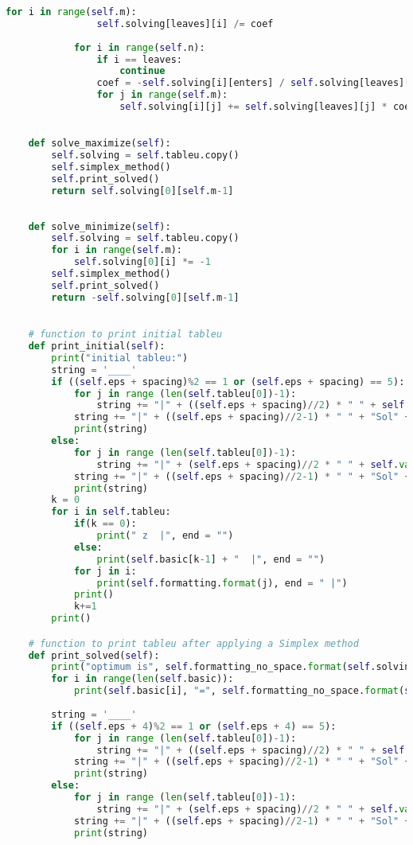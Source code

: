 \documentclass[12pt, legalpaper]{exam}
\begin{document}
\begin{lstlisting}[language=Python, caption=Программа на Python, label=lst:python-code]
            for i in range(self.m):
                self.solving[leaves][i] /= coef
        
            for i in range(self.n):
                if i == leaves:
                    continue
                coef = -self.solving[i][enters] / self.solving[leaves][enters]
                for j in range(self.m):
                    self.solving[i][j] += self.solving[leaves][j] * coef

    
    def solve_maximize(self):
        self.solving = self.tableu.copy()
        self.simplex_method()
        self.print_solved()
        return self.solving[0][self.m-1]
        
    
    def solve_minimize(self): 
        self.solving = self.tableu.copy()
        for i in range(self.m):
            self.solving[0][i] *= -1
        self.simplex_method()
        self.print_solved()
        return -self.solving[0][self.m-1]

    
    # function to print initial tableu
    def print_initial(self):
        print("initial tableu:")
        string = '____'
        if ((self.eps + spacing)%2 == 1 or (self.eps + spacing) == 5):
            for j in range (len(self.tableu[0])-1):
                string += "|" + ((self.eps + spacing)//2) * " " + self.vars[j] + ((self.eps + spacing)//2) * " "
            string += "|" + ((self.eps + spacing)//2-1) * " " + "Sol" + (self.eps + spacing)//2 * " " + "|"
            print(string)
        else: 
            for j in range (len(self.tableu[0])-1):
                string += "|" + (self.eps + spacing)//2 * " " + self.vars[j] + ((self.eps + spacing)//2-1) * " "
            string += "|" + ((self.eps + spacing)//2-1) * " " + "Sol" + ((self.eps + spacing)//2-1) * " " + "|"
            print(string)
        k = 0
        for i in self.tableu:
            if(k == 0):
                print(" z  |", end = "")
            else:
                print(self.basic[k-1] + "  |", end = "")
            for j in i:
                print(self.formatting.format(j), end = " |")
            print()
            k+=1
        print()

    # function to print tableu after applying a Simplex method
    def print_solved(self):
        print("optimum is", self.formatting_no_space.format(self.solving[0][self.m-1]))
        for i in range(len(self.basic)):
            print(self.basic[i], "=", self.formatting_no_space.format(self.solving[i+1][self.m-1]))
            
        string = '____'
        if ((self.eps + 4)%2 == 1 or (self.eps + 4) == 5):
            for j in range (len(self.tableu[0])-1):
                string += "|" + ((self.eps + spacing)//2) * " " + self.vars[j] + ((self.eps + spacing)//2) * " "
            string += "|" + ((self.eps + spacing)//2-1) * " " + "Sol" + (self.eps + spacing)//2 * " " + "|"
            print(string)
        else: 
            for j in range (len(self.tableu[0])-1):
                string += "|" + (self.eps + spacing)//2 * " " + self.vars[j] + ((self.eps + spacing)//2-1) * " "
            string += "|" + ((self.eps + spacing)//2-1) * " " + "Sol" + ((self.eps + spacing)//2-1) * " " + "|"
            print(string)


\end{lstlisting}
\end{document}
